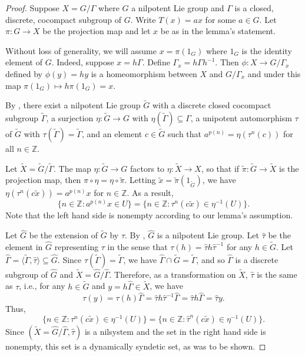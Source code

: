 \documentclass{article}
\theoremstyle{plain}
\theoremstyle{claim}
\theoremstyle{definition}
\theoremstyle{plain}
\theoremstyle{plain}
\newcommand{\Z}{\mathbb{Z}}
\newcommand{\1}{\boldsymbol{1}}
\begin{document}
\begin{proof}
Suppose $X = G/\Gamma$ where $G$ a nilpotent Lie group and $\Gamma$ is a closed, discrete, cocompact subgroup of $G$. Write $T(x) = ax$  for some $a \in G$. Let $\pi: G \to X$ be the projection map and let $x$ be as in the lemma's statement. 


Without loss of generality, we will assume $x = \pi(1_G)$ where $1_G$ is the identity element of $G$. Indeed, suppose $x = h \Gamma$. Define $\Gamma_x = h \Gamma h^{-1}$. Then $\phi: X \to G/\Gamma_x$ defined by $\phi(y) = hy$ is a homeomorphism between $X$ and $G/\Gamma_x$ and under this map $\pi(1_G) \mapsto h \pi(1_G) = x$.

By \cite[Proposition 3.14]{Leibman05a}, there exist a nilpotent Lie group $\tilde{G}$ with a discrete closed cocompact subgroup $\tilde{\Gamma}$, a surjection $\eta: \tilde{G} \to G$ with $\eta(\tilde{\Gamma}) \subseteq \Gamma$, a unipotent automorphism $\tau$ of $\tilde{G}$ with $\tau(\tilde{\Gamma}) = \tilde{\Gamma}$, and an element $c \in \tilde{G}$ such that $a^{p(n)} = \eta(\tau^n(c))$ for all $n \in \Z$.

Let $\tilde{X} = \tilde{G}/\tilde{\Gamma}$. The map $\eta: \tilde{G} \to G$ factors to $\eta: \tilde{X} \to X$, so that if $\tilde{\pi}: \tilde{G} \to \tilde{X}$ is the projection map, then $\pi \circ \eta = \eta \circ \tilde{\pi}$. Letting $\tilde{x} = \tilde{\pi}(1_{\tilde{G}})$, we have $\eta(\tau^n (c \tilde{x})) = a^{p(n)} x$ for $n \in \Z$. As a result,
\[
    \{n \in \Z: a^{p(n)} x \in U\} = \{n \in \Z: \tau^n (c \tilde{x}) \in \eta^{-1}(U)\}.
\]
Note that the left hand side is nonempty according to our lemma's assumption.

Let $\hat{G}$ be the extension of $\tilde{G}$ by $\tau$. By \cite[Proposition 3.9]{Leibman05a}, $\hat{G}$ is a nilpotent Lie group. Let $\hat{\tau}$ be the element in $\hat{G}$ representing $\tau$ in the sense that $\tau(h) = \hat{\tau} h \hat{\tau}^{-1}$ for any $h \in \tilde{G}$. Let $\hat{\Gamma} = \langle \tilde{\Gamma}, \hat{\tau} \rangle \subseteq \hat{G}$. Since $\tau(\tilde{\Gamma}) = \tilde{\Gamma}$, we have $\hat{\Gamma} \cap \tilde{G} = \tilde{\Gamma}$, and so $\hat{\Gamma}$ is a discrete subgroup of $\hat{G}$ and $\tilde{X} = \hat{G}/\hat{\Gamma}$. Therefore, as a transformation on $\tilde{X}$, $\hat{\tau}$ is the same as $\tau$, i.e., for any $h \in \tilde{G}$ and $y = h \hat{\Gamma} \in \tilde{X}$, we have 
\[
    \tau(y) = \tau(h) \hat{\Gamma} = \hat{\tau} h \hat{\tau}^{-1} \hat{\Gamma} = \hat{\tau} h \hat{\Gamma} = \hat{\tau} y.
\]
Thus,
\[
    \{n \in \Z: \tau^n (c \tilde{x}) \in \eta^{-1}(U)\} = \{n \in \Z: \hat{\tau}^n (c \tilde{x}) \in \eta^{-1}(U)\}.
\]
Since $(\tilde{X}= \hat{G}/\hat{\Gamma}, \hat{\tau})$ is a nilsystem and the set in the right hand side is nonempty, this set is a dynamically syndetic set, as was to be shown.
\end{proof}
\end{document}
